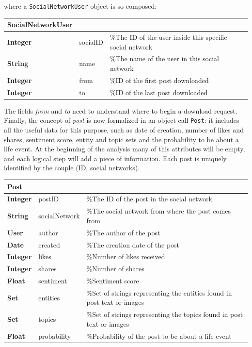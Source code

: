 where a \texttt{SocialNetworkUser} object is so composed:

\begin{center}
\label{tab:social}
\begin{tabular}{lll}
\hline
SocialNetworkUser & & \\
\hline
\textbf{Integer} & socialID & \%The ID of the user inside this specific social network \\
\textbf{String} & name & \%The name of the user in this social network \\
\textbf{Integer} & from & \%ID of the first post downloaded \\
\textbf{Integer} & to & \%ID of the last post downloaded \\
\hline
\end{tabular}
\end{center}

The fields \emph{from} and \emph{to} need to understand where to begin a download request. Finally, the concept of \emph{post} is now formalized in an object call \texttt{Post}: it includes all the useful data for this purpose, such as date of creation, number of likes and shares, sentiment score, entity and topic sets and the probability to be about a life event. At the beginning of the analysis many of this attributes will be empty, and each logical step will add a piece of information. Each post is uniquely identified by the couple (ID, social networks).

\begin{center}
\label{tab:post}
\begin{tabular}{lll}
\hline
Post & & \\
\hline
\textbf{Integer} & postID & \%The ID of the post in the social network\\
\textbf{String} & socialNetwork & \%The social network from where the post comes from \\
\textbf{User} & author & \%The author of the post \\
\textbf{Date} & created & \%The creation date of the post \\
\textbf{Integer} & likes & \%Number of likes received \\
\textbf{Integer} & shares & \%Number of shares \\
\textbf{Float} & sentiment & \%Sentiment score \\
\textbf{Set} & entities & \%Set of strings representing the entities found in post text or images \\
\textbf{Set} & topics & \%Set of strings representing the topics found in post text or images \\
\textbf{Float} & probability & \%Probability of the post to be about a life event \\
\hline
\end{tabular}
\end{center}

